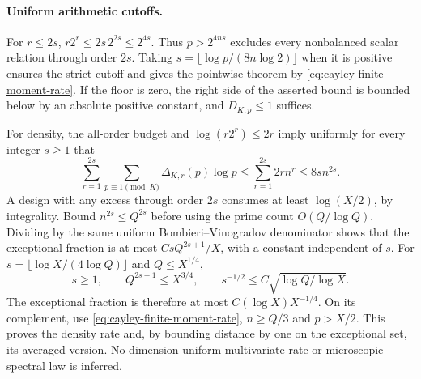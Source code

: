 \paragraph{Uniform arithmetic cutoffs.}
For $r\le2s$, $r2^r\le2s\,2^{2s}\le2^{4s}$.
Thus $p>2^{4ns}$ excludes every nonbalanced scalar relation through order
$2s$. Taking $s=\lfloor\log p/(8n\log2)\rfloor$ when it is positive
ensures the strict cutoff and gives the pointwise theorem by
\eqref{eq:cayley-finite-moment-rate}. If the floor is zero, the right side
of the asserted bound is bounded below by an absolute positive constant,
and $D_{K,p}\le1$ suffices.

For density, the all-order budget and $\log(r2^r)\le2r$ imply uniformly
for every integer $s\ge1$ that
\[
 \sum_{r=1}^{2s}\sum_{p\equiv1\pmod K}\Delta_{K,r}(p)\log p
 \le\sum_{r=1}^{2s}2r n^r\le8s n^{2s}.
\]
A design with any excess through order $2s$ consumes at least $\log(X/2)$,
by integrality. Bound $n^{2s}\le Q^{2s}$ before using the prime count
$O(Q/\log Q)$. Dividing by the same uniform Bombieri--Vinogradov
denominator shows that the exceptional fraction is at most
$CsQ^{2s+1}/X$, with a constant independent of $s$.
For $s=\lfloor\log X/(4\log Q)\rfloor$ and $Q\le X^{1/4}$,
\[
 s\ge1,\qquad Q^{2s+1}\le X^{3/4},\qquad
 s^{-1/2}\le C\sqrt{\log Q/\log X}.
\]
The exceptional fraction is therefore at most $C(\log X)X^{-1/4}$.
On its complement, use \eqref{eq:cayley-finite-moment-rate},
$n\ge Q/3$ and $p>X/2$. This proves the density rate and, by bounding
distance by one on the exceptional set, its averaged version.
No dimension-uniform multivariate rate or microscopic spectral law is inferred.
